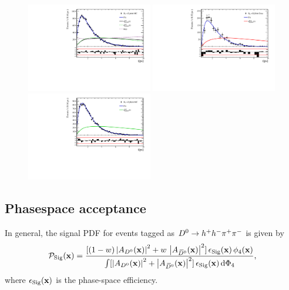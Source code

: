 \begin{figure}[h]
\includegraphics[height=!,width=0.49\textwidth]{figs/Acceptance/adaptive_N4/timeAccRatioFit_norm_mc_Run2_t1.pdf}
\includegraphics[height=!,width=0.49\textwidth]{figs/Acceptance/adaptive_N4/timeAccRatioFit_signal_B0_Run2_t1.pdf}
\includegraphics[height=!,width=0.49\textwidth]{figs/Acceptance/adaptive_N4/timeAccRatioFit_signal_mc_Run2_t1.pdf}
\caption{}
\label{fig:}
\end{figure}

\clearpage
\subsection{Phasespace acceptance}
\label{sec:phasespaceAcceptance}


In general, the signal PDF for events tagged as ${{D}^0} \rightarrow h^+ h^- {{\pi}^+} {{\pi}^-}$ is given by
\begin{equation}
	\mathcal P_{\rm Sig}(\phsPoint) %
	=  
	\frac{ [(1-w)\left\vert   A_{\Dz}(\phsPoint) \right\vert^{2} + w \, \left\vert    A_{\Dzb}(\phsPoint) \right\vert^{2} ]\,\epsilon_{\rm Sig}(\phsPoint) \, \phsd(\phsPoint) }
	{\int [\left\vert  A_{\Dz}(\phsPoint) \right\vert^{2} + \left\vert    A_{\Dzb}(\phsPoint) \right\vert^{2} ]\, \epsilon_{\rm Sig}(\phsPoint) \, \text{d}\Phi_{4} } , 
\label{eq:sigPDF}
\end{equation}
where
$\epsilon_{\rm Sig}(\mathbf{x})$ is the phase-space efficiency. 


